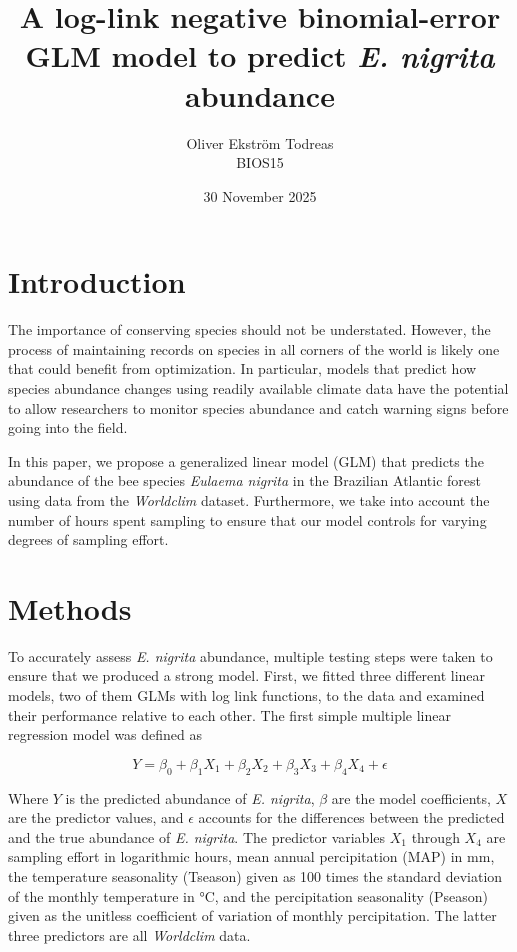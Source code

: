 \documentclass{article}
\title{A log-link negative binomial-error GLM model to predict \textit{E. nigrita} abundance}
\author{Oliver Ekström Todreas \\ BIOS15}
\date{30 November 2025}
\begin{document}
\maketitle
\thispagestyle{empty}
\newpage

\section{Introduction}

The importance of conserving species should not be understated. However, the process of maintaining records on species in all corners of the world is likely one that could benefit from optimization. In particular, models that predict how species  abundance changes using readily available climate data have the potential to allow researchers to monitor species abundance and catch warning signs before going into the field.

In this paper, we propose a generalized linear model (GLM) that predicts the abundance of the bee species \textit{Eulaema nigrita} in the Brazilian Atlantic forest using data from the \textit{Worldclim} dataset. Furthermore, we take into account the number of hours spent sampling to ensure that our model controls for varying degrees of sampling effort.

\section{Methods}

To accurately assess \textit{E. nigrita} abundance, multiple testing steps were taken to ensure that we produced a strong model. First, we fitted three different linear models, two of them GLMs with log link functions, to the data and examined their performance relative to each other. The first simple multiple linear regression model was defined as

$$
Y = \beta_0 + \beta_1 X_1 + \beta_2 X_2 + \beta_3 X_3 + \beta_4 X_4 + \epsilon
$$

Where $Y$ is the predicted abundance of \textit{E. nigrita}, $\beta$ are the model coefficients, $X$ are the predictor values, and $\epsilon$ accounts for the differences between the predicted and the true abundance of \textit{E. nigrita}. The predictor variables $X_1$ through $X_4$ are sampling effort in logarithmic hours, mean annual percipitation (MAP) in mm, the temperature seasonality (Tseason) given as 100 times the standard deviation of the monthly temperature in °C, and the percipitation seasonality (Pseason) given as the unitless coefficient of variation of monthly percipitation. The latter three predictors are all \textit{Worldclim} data.
\end{document}
